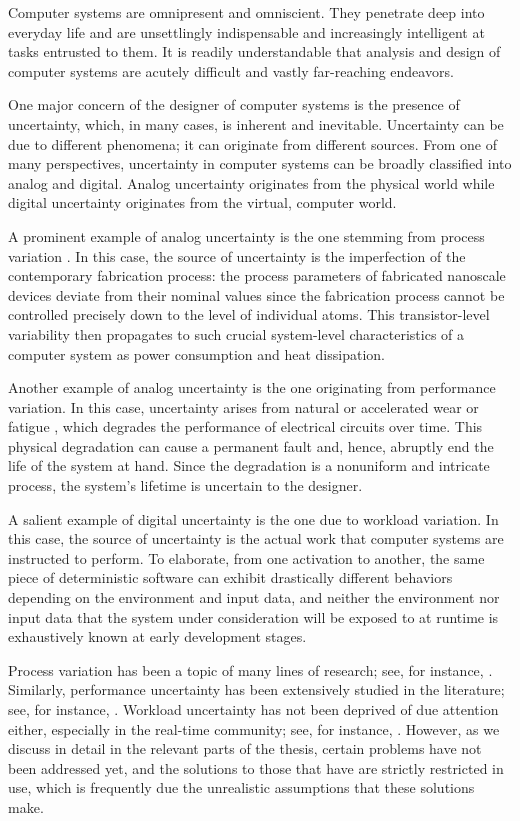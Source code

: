 Computer systems are omnipresent and omniscient. They penetrate deep into
everyday life and are unsettlingly indispensable and increasingly intelligent at
tasks entrusted to them. It is readily understandable that analysis and design
of computer systems are acutely difficult and vastly far-reaching endeavors.

One major concern of the designer of computer systems is the presence of
uncertainty, which, in many cases, is inherent and inevitable. Uncertainty can
be due to different phenomena; it can originate from different sources. From one
of many perspectives, uncertainty in computer systems can be broadly classified
into analog and digital. Analog uncertainty originates from the physical world
while digital uncertainty originates from the virtual, computer world.

A prominent example of analog uncertainty is the one stemming from process
variation \cite{srivastava2010}. In this case, the source of uncertainty is the
imperfection of the contemporary fabrication process: the process parameters of
fabricated nanoscale devices deviate from their nominal values since the
fabrication process cannot be controlled precisely down to the level of
individual atoms. This transistor-level variability then propagates to such
crucial system-level characteristics of a computer system as power consumption
and heat dissipation.

Another example of analog uncertainty is the one originating from performance
variation. In this case, uncertainty arises from natural or accelerated wear or
fatigue \cite{jedec2016}, which degrades the performance of electrical circuits
over time. This physical degradation can cause a permanent fault and, hence,
abruptly end the life of the system at hand. Since the degradation is a
nonuniform and intricate process, the system's lifetime is uncertain to the
designer.

A salient example of digital uncertainty is the one due to workload variation.
In this case, the source of uncertainty is the actual work that computer systems
are instructed to perform. To elaborate, from one activation to another, the
same piece of deterministic software can exhibit drastically different behaviors
depending on the environment and input data, and neither the environment nor
input data that the system under consideration will be exposed to at runtime is
exhaustively known at early development stages.

Process variation has been a topic of many lines of research; see, for instance,
\cite{bhardwaj2006, bhardwaj2008, chandra2010, juan2012, lee2013}. Similarly,
performance uncertainty has been extensively studied in the literature; see, for
instance, \cite{coskun2006, huang2009b, das2014c}. Workload uncertainty has not
been deprived of due attention either, especially in the real-time community;
see, for instance, \cite{diaz2002, santinelli2011, quinton2012, tanasa2015}.
However, as we discuss in detail in the relevant parts of the thesis, certain
problems have not been addressed yet, and the solutions to those that have are
strictly restricted in use, which is frequently due the unrealistic assumptions
that these solutions make.

